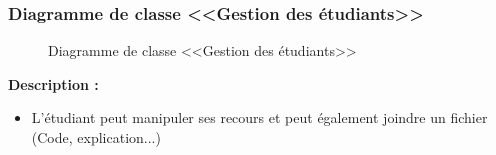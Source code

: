 \documentclass[12pt]{report}
\begin{document}
\newpage

\subsubsection{Diagramme de classe <<Gestion des étudiants>>}

\begin{figure}[h]
\centering
    \centerline{}
    \caption{Diagramme de classe <<Gestion des étudiants>>}
\end{figure}

\vspace{-0.1in}

\textbf{Description :}

\vspace{-0.1in}
\begin{itemize}
    \item L'étudiant peut manipuler ses recours et peut également joindre un fichier (Code, explication...)
\end{itemize}

\vspace{-0.4in}
\end{document}
